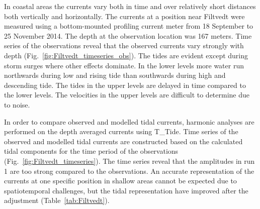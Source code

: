 
In coastal areas the currents vary both in time and over relatively short distances both vertically and horizontally. The currents at a position near Filtvedt were measured using a bottom-mounted profiling current meter from 18 September to 25 November 2014. The depth at the observation location was 167 meters. Time series of the observations reveal that the observed currents vary strongly with depth (Fig.~\ref{fig:Filtvedt_timeseries_obs}). The tides are evident except during storm surges where other effects dominate. In the lower levels more water run northwards during low and rising tide than southwards during high and descending tide. The tides in the upper levels are delayed in time compared to the lower levels. The velocities in the upper levels are difficult to determine due to noise. 

In order to compare observed and modelled tidal currents, harmonic analyses are performed on the depth averaged currents using T\_Tide. Time series of the observed and modelled tidal currents are constructed based on the calculated tidal components for the time period of the observations (Fig.~\ref{fig:Filtvedt_timeseries}). The time series reveal that the amplitudes in run 1 are too strong compared to the observations. 
An accurate representation of the currents at one specific position in shallow areas cannot be expected due to spatiotemporal challenges, but the tidal representation have improved after the adjustment (Table~\ref{tab:Filtvedt}). %

